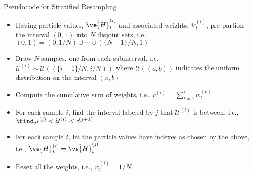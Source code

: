 \documentclass{article}
\begin{document}
\begin{table}[h]
\caption{Pseudocode for Stratified Resampling}
\label{tab:SR}
\begin{itemize}
\item Having particle values, $\breve{\ve{H}}_t^{(i)}$ and associated weights, $\breve{w}_t^{(i)}$,
pre-partion the interval $(0,1)$ into $N$ disjoint sets, i.e.,
   $ (0,1) = (0,1/N) \cup \cdots \cup (\{N-1\}/N,1)$
\item Draw $N$ samples, one from each subinterval, i.e.
$    \mathcal{U}^{(i)} \sim \mathcal{U}\left((\{i-1\}/N, i/N) \right)$
    \noindent where $\mathcal{U}\left((a,b) \right)$ indicates the uniform distribution on the interval $(a,b)$
\item Compute the cumulative sum of weights, i.e.,
$    c^{(i)} = \sum_{t=1}^i \breve{w}_t^{(k)}$
\item For each sample $i$, find the interval labeled by $j$ that $\mathcal{U}^{(i)}$ is between, i.e.,
$    \find_j  c^{(j)} < \mathcal{U}^{(i)} < c^{(j+1)}$
\item For each sample $i$, let the particle values have indexes as chosen by the above, i.e.,
$    \ve{H}_t^{(i)}  = \breve{\ve{H}}_t^{(j)}$
\item Reset all the weights, i.e., $w_t^{(i)}=1/N$
\end{itemize}
\end{table}


\clearpage \newpage

%

\end{document}
